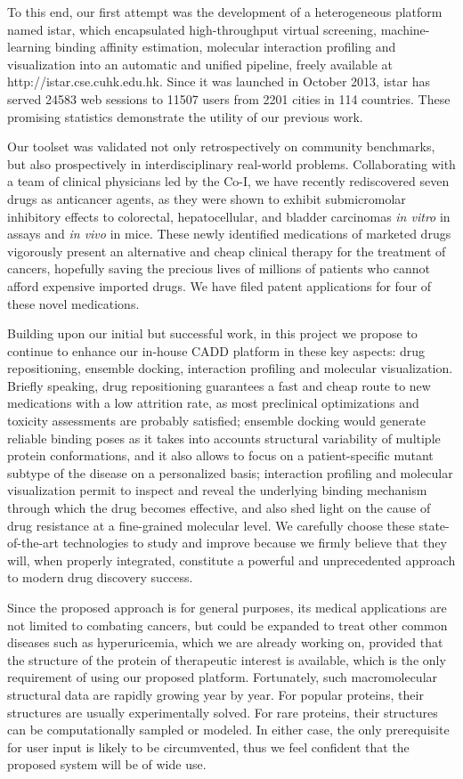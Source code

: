 \documentclass[a4paper,12pt]{article}
\begin{document}
To this end, our first attempt was the development of a heterogeneous platform named istar, which encapsulated high-throughput virtual screening, machine-learning binding affinity estimation, molecular interaction profiling and visualization into an automatic and unified pipeline, freely available at http://istar.cse.cuhk.edu.hk. Since it was launched in October 2013, istar has served 24583 web sessions to 11507 users from 2201 cities in 114 countries. These promising statistics demonstrate the utility of our previous work.

Our toolset was validated not only retrospectively on community benchmarks, but also prospectively in interdisciplinary real-world problems. Collaborating with a team of clinical physicians led by the Co-I, we have recently rediscovered seven drugs as anticancer agents, as they were shown to exhibit submicromolar inhibitory effects to colorectal, hepatocellular, and bladder carcinomas \textit{in vitro} in assays and \textit{in vivo} in mice. These newly identified medications of marketed drugs vigorously present an alternative and cheap clinical therapy for the treatment of cancers, hopefully saving the precious lives of millions of patients who cannot afford expensive imported drugs. We have filed patent applications for four of these novel medications.

Building upon our initial but successful work, in this project we propose to continue to enhance our in-house CADD platform in these key aspects: drug repositioning, ensemble docking, interaction profiling and molecular visualization. Briefly speaking, drug repositioning guarantees a fast and cheap route to new medications with a low attrition rate, as most preclinical optimizations and toxicity assessments are probably satisfied; ensemble docking would generate reliable binding poses as it takes into accounts structural variability of multiple protein conformations, and it also allows to focus on a patient-specific mutant subtype of the disease on a personalized basis; interaction profiling and molecular visualization permit to inspect and reveal the underlying binding mechanism through which the drug becomes effective, and also shed light on the cause of drug resistance at a fine-grained molecular level. We carefully choose these state-of-the-art technologies to study and improve because we firmly believe that they will, when properly integrated, constitute a powerful and unprecedented approach to modern drug discovery success.

Since the proposed approach is for general purposes, its medical applications are not limited to combating cancers, but could be expanded to treat other common diseases such as hyperuricemia, which we are already working on, provided that the structure of the protein of therapeutic interest is available, which is the only requirement of using our proposed platform. Fortunately, such macromolecular structural data are rapidly growing year by year. For popular proteins, their structures are usually experimentally solved. For rare proteins, their structures can be computationally sampled or modeled. In either case, the only prerequisite for user input is likely to be circumvented, thus we feel confident that the proposed system will be of wide use.
\end{document}
